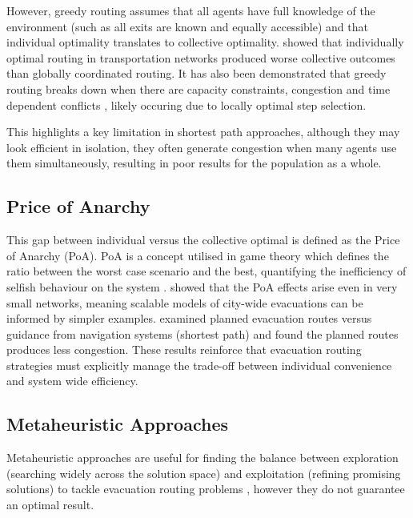 \documentclass[12pt,a4paper]{report}
\begin{document}
However, greedy routing assumes that all agents have full knowledge of the environment (such as all exits are known and equally accessible) and that individual optimality translates to collective optimality. \cite{STEPANOV_2009_PRICE_ANARCHY} showed that individually optimal routing in transportation networks produced worse collective outcomes than globally coordinated routing. It has also been demonstrated that greedy routing breaks down when there are capacity constraints, congestion and time dependent conflicts \citep{MIN_2014_CAPACITY,HONG_2018_CAPACITY, SHAHABI_2018_CAPACITY}, likely occuring due to locally optimal step selection.

This highlights a key limitation in shortest path approaches, although they may look efficient in isolation, they often generate congestion when many agents use them simultaneously, resulting in poor results for the population as a whole.

\subsection{Price of Anarchy}
This gap between individual versus the collective optimal is defined as the Price of Anarchy (PoA)\citep{PAPADIMITRIOU_2001_POA}. PoA is a concept utilised in game theory \citep{COMINETTI_2024_POA} which defines the ratio between the worst case scenario and the best, quantifying the inefficiency of selfish behaviour on the system \citep{ROUGHGARDEN_2015_POA}. \cite{ROUGHGARDEN_2003_POA} showed that the PoA effects arise even in very small networks, meaning scalable models of city-wide evacuations can be informed by simpler examples. \cite{FRIES_2022_POA} examined planned evacuation routes versus guidance from navigation systems (shortest path) and found the planned routes produces less congestion. These results reinforce that evacuation routing strategies must explicitly manage the trade-off between individual convenience and system wide efficiency.

\subsection{Metaheuristic Approaches}
Metaheuristic approaches are useful for finding the balance between exploration (searching widely across the solution space) and exploitation (refining promising solutions) to tackle evacuation routing problems \citep{ABDEL_BASSET_2018_METAHEURISTICS}, however they do not guarantee an optimal result.
\end{document}
